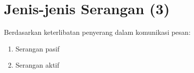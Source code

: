 \documentclass{article}
\begin{document}

\section*{Jenis-jenis Serangan (3)}

Berdasarkan keterlibatan penyerang dalam komunikasi pesan:
\begin{enumerate}
    \item Serangan pasif
    \item Serangan aktif
\end{enumerate}
\end{document}
